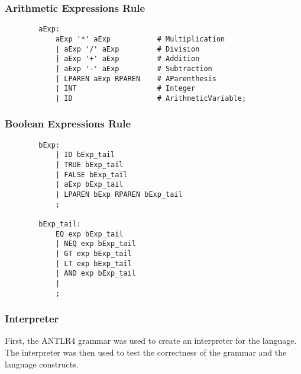 \documentclass{beamer}
\begin{document}
\begin{frame}[fragile]
    \frametitle{Arithmetic Expressions Rule}
    \scriptsize
    \begin{verbatim}
        aExp:
            aExp '*' aExp			# Multiplication
            | aExp '/' aExp			# Division
            | aExp '+' aExp			# Addition
            | aExp '-' aExp			# Subtraction
            | LPAREN aExp RPAREN	# AParenthesis
            | INT					# Integer
            | ID					# ArithmeticVariable;
    \end{verbatim}
\end{frame}

\begin{frame}[fragile]
    \frametitle{Boolean Expressions Rule}
    \scriptsize
    \begin{verbatim}        
        bExp:
            | ID bExp_tail
            | TRUE bExp_tail
            | FALSE bExp_tail
            | aExp bExp_tail
            | LPAREN bExp RPAREN bExp_tail
            ;

        bExp_tail:
            EQ exp bExp_tail
            | NEQ exp bExp_tail
            | GT exp bExp_tail
            | LT exp bExp_tail
            | AND exp bExp_tail
            |
            ;
    \end{verbatim}
\end{frame}


\begin{frame}\frametitle{Interpreter}
    First, the ANTLR4 grammar was used to create an interpreter for the language. The interpreter was then used to test the correctness of the grammar and the language constructs.
\end{frame}
\end{document}
